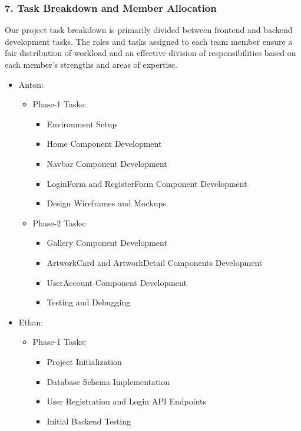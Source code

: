 \documentclass[11pt]{article}
\begin{document}
\subsubsection{7. Task Breakdown and Member Allocation}
\label{sec:orgb313068}

Our project task breakdown is primarily divided between frontend and backend
development tasks. The roles and tasks assigned to each team member ensure a
fair distribution of workload and an effective division of responsibilities
based on each member's strengths and areas of expertise.

\begin{itemize}
\item Anton:

\begin{itemize}
\item Phase-1 Tasks:
\begin{itemize}
\item Environment Setup
\item Home Component Development
\item Navbar Component Development
\item LoginForm and RegisterForm Component Development
\item Design Wireframes and Mockups
\end{itemize}

\item Phase-2 Tasks:
\begin{itemize}
\item Gallery Component Development
\item ArtworkCard and ArtworkDetail Components Development
\item UserAccount Component Development
\item Testing and Debugging
\end{itemize}
\end{itemize}

\item Ethan:

\begin{itemize}
\item Phase-1 Tasks:
\begin{itemize}
\item Project Initialization
\item Database Schema Implementation
\item User Registration and Login API Endpoints
\item Initial Backend Testing
\end{itemize}


\end{itemize}
\end{itemize}
\end{document}
